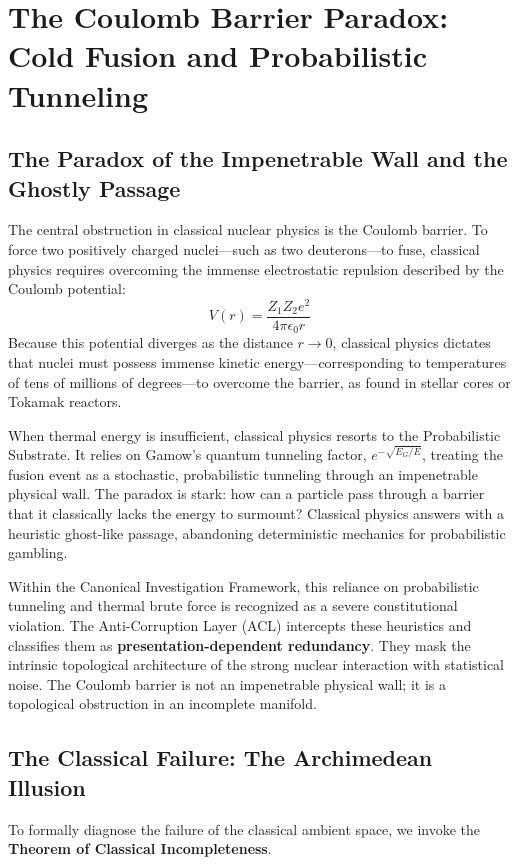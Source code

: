 \documentclass[12pt,twoside]{extbook}
\theoremstyle{definition}
\theoremstyle{remark}
\newcommand{\term}[1]{\textcolor{brandPrimary}{\textbf{#1}}}
\begin{document}
\chapter{The Coulomb Barrier Paradox: Cold Fusion and Probabilistic Tunneling}

\section{The Paradox of the Impenetrable Wall and the Ghostly Passage}
The central obstruction in classical nuclear physics is the Coulomb barrier. To force two positively charged nuclei—such as two deuterons—to fuse, classical physics requires overcoming the immense electrostatic repulsion described by the Coulomb potential:
\begin{equation}
V(r) = \frac{Z_1 Z_2 e^2}{4 \pi \epsilon_0 r}
\end{equation}
Because this potential diverges as the distance $r \to 0$, classical physics dictates that nuclei must possess immense kinetic energy—corresponding to temperatures of tens of millions of degrees—to overcome the barrier, as found in stellar cores or Tokamak reactors. 

When thermal energy is insufficient, classical physics resorts to the Probabilistic Substrate. It relies on Gamow's quantum tunneling factor, $e^{-\sqrt{E_G/E}}$, treating the fusion event as a stochastic, probabilistic tunneling through an impenetrable physical wall. The paradox is stark: how can a particle pass through a barrier that it classically lacks the energy to surmount? Classical physics answers with a heuristic ghost-like passage, abandoning deterministic mechanics for probabilistic gambling.

Within the Canonical Investigation Framework, this reliance on probabilistic tunneling and thermal brute force is recognized as a severe constitutional violation. The Anti-Corruption Layer (ACL) intercepts these heuristics and classifies them as \term{presentation-dependent redundancy}. They mask the intrinsic topological architecture of the strong nuclear interaction with statistical noise. The Coulomb barrier is not an impenetrable physical wall; it is a topological obstruction in an incomplete manifold.

\section{The Classical Failure: The Archimedean Illusion}
To formally diagnose the failure of the classical ambient space, we invoke the \term{Theorem of Classical Incompleteness}. 
\end{document}
